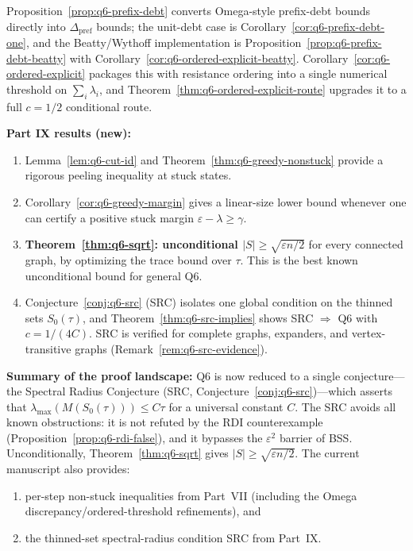 Proposition~\ref{prop:q6-prefix-debt} converts Omega-style
prefix-debt bounds directly into \(\Delta_{\mathrm{pref}}\) bounds;
the unit-debt case is Corollary~\ref{cor:q6-prefix-debt-one},
and the Beatty/Wythoff implementation is
Proposition~\ref{prop:q6-prefix-debt-beatty} with
Corollary~\ref{cor:q6-ordered-explicit-beatty}.
Corollary~\ref{cor:q6-ordered-explicit} packages this with
resistance ordering into a single numerical threshold on
\(\sum_i\lambda_i\), and Theorem~\ref{thm:q6-ordered-explicit-route}
upgrades it to a full \(c=1/2\) conditional route.

\medskip\noindent
\textbf{Part IX results (new):}
\begin{enumerate}[nosep]
\item Lemma~\ref{lem:q6-cut-id} and
Theorem~\ref{thm:q6-greedy-nonstuck} provide a rigorous peeling
inequality at stuck states.
\item Corollary~\ref{cor:q6-greedy-margin} gives a linear-size lower
bound whenever one can certify a positive stuck margin
\(\varepsilon-\lambda\ge\gamma\).
\item \textbf{Theorem~\ref{thm:q6-sqrt}: unconditional
$|S|\ge\sqrt{\varepsilon n/2}$} for every connected graph,
by optimizing the trace bound over $\tau$.
This is the best known unconditional bound for general Q6.
\item Conjecture~\ref{conj:q6-src} (SRC) isolates one global condition
on the thinned sets \(S_0(\tau)\), and
Theorem~\ref{thm:q6-src-implies} shows SRC \(\Rightarrow\) Q6 with
\(c=1/(4C)\).
SRC is verified for complete graphs, expanders, and vertex-transitive
graphs (Remark~\ref{rem:q6-src-evidence}).
\end{enumerate}

\medskip\noindent
\textbf{Summary of the proof landscape:}
Q6 is now reduced to a single conjecture---the Spectral Radius
Conjecture (SRC, Conjecture~\ref{conj:q6-src})---which asserts that
$\lambda_{\max}(M(S_0(\tau)))\le C\tau$ for a universal constant $C$.
The SRC avoids all known obstructions: it is not refuted by the RDI
counterexample (Proposition~\ref{prop:q6-rdi-false}), and it bypasses
the $\varepsilon^2$ barrier of BSS.
Unconditionally, Theorem~\ref{thm:q6-sqrt} gives
$|S|\ge\sqrt{\varepsilon n/2}$.
The current manuscript also provides:
\begin{enumerate}[nosep]
\item per-step non-stuck inequalities from Part~VII
(including the Omega discrepancy/ordered-threshold refinements), and
\item the thinned-set spectral-radius condition SRC from Part~IX.
\end{enumerate}

